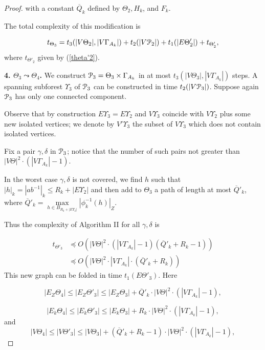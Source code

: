 \documentclass[a4paper,12pt]{article}
\newcommand{\G}{\Gamma }
\newcommand{\g}{\gamma }
\renewcommand{\d}{\delta }
\newcommand{\T}{\Theta }
\newcommand{\U}{\Upsilon }
\newcommand{\cP}{{\cal{P}}}
\numberwithin{equation}{section}
\numberwithin{figure}{section}
\begin{document}
\begin{proof}
with a constant $\overline{Q}_k$ defined by $\T_2, H_k$, and
$F_k$.


The total complexity of this modification is

\begin{equation}\label{theta3}
t_{\T_3} = t_3(|V \T_2|, |V \G_{A_k}|) + t_2(|V\cP_2|)+
t_1(|E\T'_2|) + t_{\T'_2},
\end{equation}
where $t_{\T'_2}$ given by (\ref{theta'2}).


{\bf 4. $\T_3 \leadsto \T_4$.} We construct $\cP_3=\T_3\times
\G_{A_k}$ in at most $t_3(|V \T_3|, |V \G_{A_k}|)$ steps. A
spanning subforest $\U_3$ of $\cP_3$ can be constructed in time
$t_2(|V\cP_3|)$. Suppose again $\cP_3$ has only one connected
component.

Observe that by construction $E\U_3 = E\U_2$ and $V\U_3$ coincide
with $V\U_2$ plus some new isolated vertices; we denote by
$V'\U_3$ the subset of $V\U_3$ which does not contain isolated
vertices.

Fix a pair $\g, \d$ in $\cP_3$; notice that the number of such
pairs not greater than $|V\T|^2 \cdot (|V \G_{A_k}|-1)$.

In the worst case $\g, \d$ is not covered, we find $h$ such that
$|h|_k = |ab^{-1}|_k \le R_k+ | E\U_2|$ and then add to $\T_3$ a
path of length at most $\overline{Q}'_k$, where
$\overline{Q}'_k=\mathop{max}\limits_{h \in B_{R_k+|
E\U_2|}}|\phi^{-1}_k(h)|_Z$.


Thus the complexity of Algorithm II for all $\g, \d$ is

\begin{equation}\label{theta'3}
\begin{split}
t_{\T'_3} &\preceq O(|V\T|^2 \cdot(|V \G_{A_k}|-1)(\overline{Q}'_k+R_k -1))\\
&\preceq O(|V\T|^2 \cdot |V \G_{A_k}|\cdot(\overline{Q}'_k+R_k))
\end{split}
\end{equation}
This new graph can be folded in time $t_1(E\T'_3)$. Here

\begin{equation}\label{eztheta4}
|E_Z\T_4| \le |E_Z\T'_3| \le |E_Z\T_3|+
\overline{Q}'_k\cdot|V\T|^2 \cdot(|V \G_{A_k}|-1),
\end{equation}

\begin{equation}\label{ektheta4}
|E_k\T_4| \le |E_k\T'_3| \le  |E_k\T_3|+ R_k\cdot|V\T|^2 \cdot(|V
\G_{A_k}|-1),
\end{equation}
and
\begin{equation}\label{vtheta4}
|V\T_4| \le |V \T'_3| \le |V \T_3|
+(\overline{Q}'_k+R_k-1)\cdot|V\T|^2 \cdot(|V \G_{A_k}|-1),
\end{equation}


\end{proof}
\end{document}
